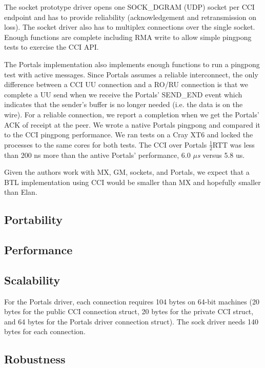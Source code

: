 \documentclass[conference]{IEEEtran}
\begin{document}
The socket prototype driver opens one SOCK\_DGRAM (UDP) socket per CCI endpoint
and has to provide reliability (acknowledgement and retransmission on loss).
The socket driver also has to multiplex connections over the single socket.
Enough functions are complete including RMA write to allow simple pingpong
tests to exercise the CCI API.

The Portals implementation also implements enough functions to run a pingpong
test with active messages. Since Portals assumes a reliable interconnect, the
only difference between a CCI UU connection and a RO/RU connection is that we
complete a UU send when we receive the Portals' SEND\_END event which indicates
that the sender's buffer is no longer needed (i.e. the data is on the wire).
For a reliable connection, we report a completion when we get the Portals' ACK
of receipt at the peer. We wrote a native Portals pingpong and compared it to
the CCI pingpong performance. We ran tests on a Cray XT6 and locked the
processes to the same cores for both tests. The CCI over Portals
\begin{math}\frac{1}{2}\end{math}RTT was less than 200 ns more than the antive
Portals' performance, 6.0 $\mu$\textit{s} versus 5.8 us.



Given the authors work with MX, GM, sockets, and Portals, we expect that a BTL
implementation using CCI would be smaller than MX and hopefully smaller than
Elan.

\subsection{Portability}

\subsection{Performance}

\subsection{Scalability}

For the Portals driver, each connection requires 104 bytes on 64-bit machines
(20 bytes for the public CCI connection struct, 20 bytes for the private CCI
struct, and 64 bytes for the Portals driver connection struct).  The sock driver
needs 140 bytes for each connection.

\subsection{Robustness}
\end{document}
